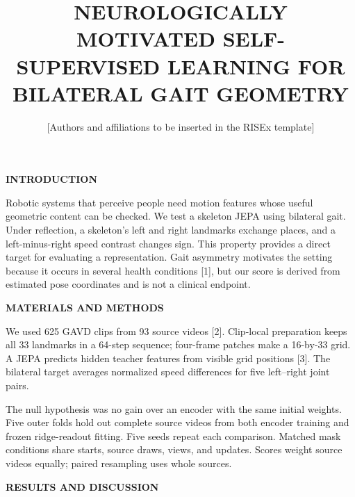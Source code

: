 \documentclass[11pt,letterpaper]{article}
\title{\vspace{-1.2em}\textbf{\MakeUppercase{Neurologically Motivated
Self-Supervised Learning for Bilateral Gait Geometry}}\vspace{-0.5em}}
\author{\normalsize [Authors and affiliations to be inserted in the RISEx template]}
\date{}
\renewcommand{\subsection}[1]{\vspace{2pt}\noindent\textbf{#1}\par\vspace{1pt}}
\begin{document}
\twocolumn[
  \begin{@twocolumnfalse}
  \maketitle
  \vspace{-1.1em}
  \end{@twocolumnfalse}
]
\subsection{INTRODUCTION}\label{introduction}

Robotic systems that perceive people need motion features whose useful
geometric content can be checked. We test a skeleton JEPA using
bilateral gait. Under reflection, a skeleton's left and right landmarks
exchange places, and a left-minus-right speed contrast changes sign.
This property provides a direct target for evaluating a representation.
Gait asymmetry motivates the setting because it occurs in several health
conditions {[}1{]}, but our score is derived from estimated pose
coordinates and is not a clinical endpoint.

\subsection{MATERIALS AND METHODS}\label{materials-and-methods}

We used 625 GAVD clips from 93 source videos {[}2{]}. Clip-local
preparation keeps all 33 landmarks in a 64-step sequence; four-frame
patches make a 16-by-33 grid. A JEPA predicts hidden teacher features
from visible grid positions {[}3{]}. The bilateral target averages
normalized speed differences for five left--right joint pairs.

The null hypothesis was no gain over an encoder with the same initial
weights. Five outer folds hold out complete source videos from both
encoder training and frozen ridge-readout fitting. Five seeds repeat
each comparison. Matched mask conditions share starts, source draws,
views, and updates. Scores weight source videos equally; paired
resampling uses whole sources.

\subsection{RESULTS AND DISCUSSION}\label{results-and-discussion}
\end{document}
